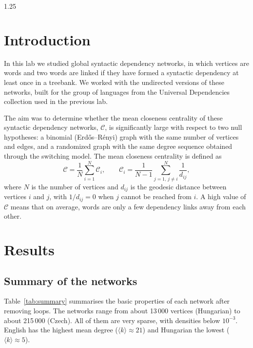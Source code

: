 \documentclass[12pt]{article}
\newcommand{\metric}{\mathcal{C}}
\newcommand{\metricname}{mean closeness centrality}
\begin{document}
\begin{spacing}{1.25}

\newpage
\tableofcontents
\newpage

\section{Introduction}

In this lab we studied global syntactic dependency networks, in which vertices are words and two words are linked if they have formed a syntactic dependency at least once in a treebank. We worked with the undirected versions of these networks, built for the group of languages from the Universal Dependencies collection used in the previous lab.

The aim was to determine whether the \metricname{} of these syntactic dependency networks, $\metric$, is significantly large with respect to two null hypotheses: a binomial (Erdős–Rényi) graph with the same number of vertices and edges, and a randomized graph with the same degree sequence obtained through the switching model. The mean closeness centrality is defined as
\begin{equation}
    \metric = \frac{1}{N}\sum_{i=1}^{N} \metric_i, \qquad
    \metric_i = \frac{1}{N-1}\sum_{j=1,\, j \neq i}^{N} \frac{1}{d_{ij}},
\end{equation}
where $N$ is the number of vertices and $d_{ij}$ is the geodesic distance between vertices $i$ and $j$, with $1/d_{ij} = 0$ when $j$ cannot be reached from $i$. A high value of $\metric$ means that on average, words are only a few dependency links away from each other.


\section{Results}

\subsection{Summary of the networks}
Table~\ref{tab:summary} summarises the basic properties of each network after removing loops. The networks range from about 13\,000 vertices (Hungarian) to about 215\,000 (Czech). All of them are very sparse, with densities below $10^{-3}$. English has the highest mean degree ($\langle k \rangle \approx 21$) and Hungarian the lowest ($\langle k \rangle \approx 5$).


\end{spacing}
\end{document}
